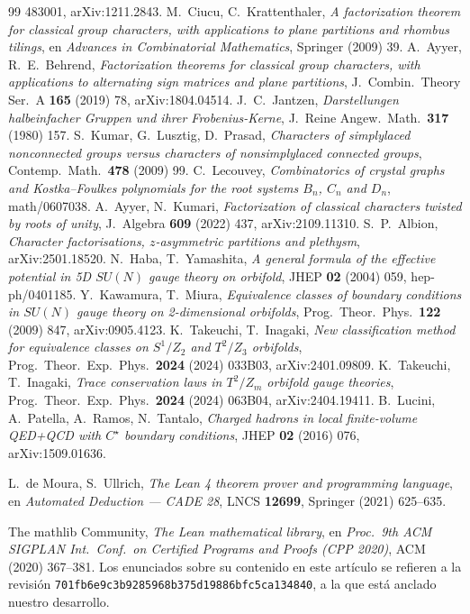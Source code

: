 \documentclass[11pt,a4paper]{article}
\begin{document}
\begin{thebibliography}{99}
483001, arXiv:1211.2843.
 M.~Ciucu, C.~Krattenthaler, \emph{A factorization theorem for classical group characters,
with applications to plane partitions and rhombus tilings}, en \emph{Advances in Combinatorial
Mathematics}, Springer (2009) 39.
 A.~Ayyer, R.~E.~Behrend, \emph{Factorization theorems for classical group characters,
with applications to alternating sign matrices and plane partitions}, J.\ Combin.\ Theory Ser.~A
\textbf{165} (2019) 78, arXiv:1804.04514.
 J.~C.~Jantzen, \emph{Darstellungen halbeinfacher Gruppen und ihrer
Frobenius-Kerne}, J.\ Reine Angew.\ Math.\ \textbf{317} (1980) 157.
 S.~Kumar, G.~Lusztig, D.~Prasad, \emph{Characters of simplylaced nonconnected groups
versus characters of nonsimplylaced connected groups}, Contemp.\ Math.\ \textbf{478} (2009) 99.
 C.~Lecouvey, \emph{Combinatorics of crystal graphs and Kostka--Foulkes polynomials
for the root systems $B_n$, $C_n$ and $D_n$}, math/0607038.
 A.~Ayyer, N.~Kumari, \emph{Factorization of classical characters twisted by roots of
unity}, J.\ Algebra \textbf{609} (2022) 437, arXiv:2109.11310.
 S.~P.~Albion, \emph{Character factorisations, $z$-asymmetric partitions and
plethysm}, arXiv:2501.18520.
 N.~Haba, T.~Yamashita, \emph{A general formula of the effective potential in 5D $SU(N)$
gauge theory on orbifold}, JHEP \textbf{02} (2004) 059, hep-ph/0401185.
 Y.~Kawamura, T.~Miura, \emph{Equivalence classes of boundary conditions in $SU(N)$ gauge
theory on 2-dimensional orbifolds}, Prog.\ Theor.\ Phys.\ \textbf{122} (2009) 847, arXiv:0905.4123.
 K.~Takeuchi, T.~Inagaki, \emph{New classification method for equivalence classes on
$S^1/Z_2$ and $T^2/Z_3$ orbifolds}, Prog.\ Theor.\ Exp.\ Phys.\ \textbf{2024} (2024) 033B03,
arXiv:2401.09809.
 K.~Takeuchi, T.~Inagaki, \emph{Trace conservation laws in $T^2/Z_m$ orbifold gauge
theories}, Prog.\ Theor.\ Exp.\ Phys.\ \textbf{2024} (2024) 063B04, arXiv:2404.19411.
 B.~Lucini, A.~Patella, A.~Ramos, N.~Tantalo, \emph{Charged hadrons in local finite-volume
QED+QCD with $C^\star$ boundary conditions}, JHEP \textbf{02} (2016) 076, arXiv:1509.01636.

 L.~de Moura, S.~Ullrich, \emph{The Lean 4 theorem prover and programming language},
en \emph{Automated Deduction --- CADE 28}, LNCS \textbf{12699}, Springer (2021) 625--635.

 The mathlib Community, \emph{The Lean mathematical library}, en \emph{Proc.\ 9th
ACM SIGPLAN Int.\ Conf.\ on Certified Programs and Proofs (CPP 2020)}, ACM (2020) 367--381. Los
enunciados sobre su contenido en este artículo se refieren a la revisión
\texttt{701fb6e9c3b9285968b375d19886bfc5ca134840}, a la que está anclado nuestro desarrollo.
\end{thebibliography}
\end{document}
